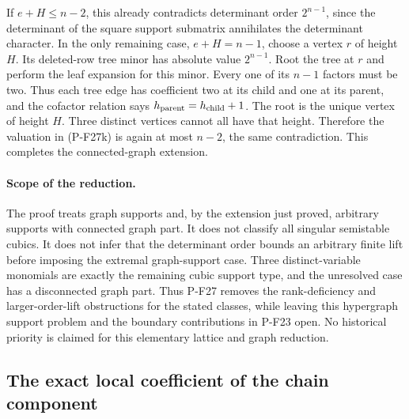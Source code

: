 \documentclass[11pt,a4paper]{article}
\begin{document}
If $e+H\le n-2$, this already contradicts determinant order
$2^{n-1}$, since the determinant of the square support submatrix
annihilates the determinant character. In the only remaining case,
$e+H=n-1$, choose a vertex $r$ of height $H$. Its deleted-row tree
minor has absolute value $2^{n-1}$. Root the tree at $r$ and perform
the leaf expansion for this minor. Every one of its $n-1$ factors
must be two. Thus each tree edge has coefficient two at its child
and one at its parent, and the cofactor relation says
$h_{\rm parent}=h_{\rm child}+1$. The root is the unique vertex of
height $H$. Three distinct vertices cannot all have that height.
Therefore the valuation in (P-F27k) is again at most $n-2$, the
same contradiction. This completes the connected-graph extension.

\paragraph{Scope of the reduction.}
The proof treats graph supports and, by the extension just proved,
arbitrary supports with connected graph part. It does not classify
all singular semistable cubics. It does not infer
that the determinant order bounds an arbitrary finite lift
before imposing the extremal graph-support case. Three
distinct-variable monomials are exactly the remaining
cubic support type, and the unresolved case has a disconnected
graph part. Thus P-F27 removes the rank-deficiency and
larger-order-lift obstructions for the stated classes, while
leaving this hypergraph support problem and the boundary
contributions in P-F23 open.
No historical priority is claimed for this elementary
lattice and graph reduction.


\subsection{The exact local coefficient of the chain component}
\end{document}
